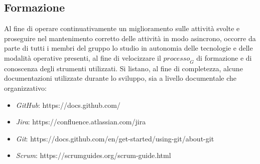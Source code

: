 \subsection{Formazione}
Al fine di operare continuativamente un miglioramento sulle attività svolte e proseguire nel mantenimento corretto delle attività in modo asincrono, occorre da parte di tutti i membri del gruppo lo studio in autonomia delle tecnologie e delle modalità operative presenti, al fine di velocizzare il $\textit{processo}_G$ di formazione e di conoscenza degli strumenti utilizzati. Si listano, al fine di
completezza, alcune documentazioni utilizzate durante lo sviluppo, sia a livello documentale che organizzativo:

\begin{itemize}
    \item \textit{GitHub}: https://docs.github.com/
    \item \textit{Jira}: https://confluence.atlassian.com/jira
    \item \textit{Git}: https://docs.github.com/en/get-started/using-git/about-git
    \item \textit{Scrum}: https://scrumguides.org/scrum-guide.html
\end{itemize}